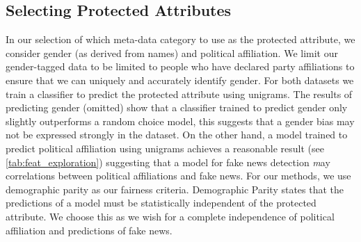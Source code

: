 \subsection{Selecting Protected Attributes}
In our selection of which meta-data category to use as the protected attribute, we consider gender (as derived from names) and political affiliation. We limit our gender-tagged data to be limited to people who have declared party affiliations to ensure that we can uniquely and accurately identify gender. For both datasets we train a classifier to predict the protected attribute using unigrams. The results of predicting gender (omitted) show that a classifier trained to predict gender only slightly outperforms a random choice model, this suggests that a gender bias may not be expressed strongly in the dataset. On the other hand, a model trained to predict political affiliation using unigrams achieves a reasonable result (see \autoref{tab:feat_exploration}) suggesting that a model for fake news detection {\textit may} correlations between political affiliations and fake news. For our methods, we use demographic parity as our fairness criteria. Demographic Parity states that the predictions of a model must be statistically independent of the protected attribute. We choose this as we wish for a complete independence of political affiliation and predictions of fake news.

